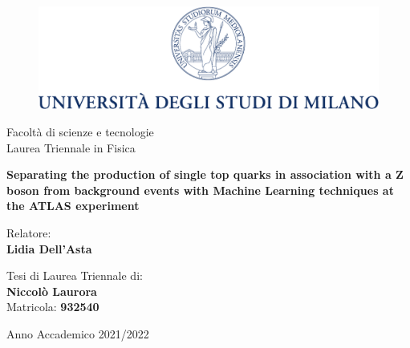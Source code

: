 


\begin{titlepage}
	
\begin{figure}[H]
\centering
\includegraphics[width=360pt]{UniversitasMediolanensis.pdf}
\vspace{0.5 cm}
\end{figure}
	
	
\begin{center}{
Facoltà di scienze e tecnologie\\
Laurea Triennale in Fisica
}
\end{center}
	
\begin{center}
\vspace{1 cm}
{
\textbf{Separating the production of single top quarks in association with a Z boson from background events with Machine Learning techniques at the ATLAS experiment} }
\end{center}
\par
\vspace{2 cm}
	
\begin{flushleft}
Relatore:\\ \textbf{Lidia Dell'Asta}\\
\end{flushleft}
	
\vspace{1 cm}
\begin{flushright}
Tesi di Laurea Triennale di:\\ \textbf{Niccolò Laurora} \\Matricola: \textbf{932540}
\end{flushright}
	
\vfill
\begin{center}
{\large Anno Accademico 2021/2022}
\end{center}
\end{titlepage}
